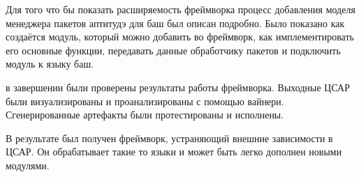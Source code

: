 Для того что бы показать расширяемость фреймворка процесс добавления моделя менеджера пакетов аптитудэ для баш был описан подробно. 
Было показано как создаётся модуль, который можно добавить во фреймворк, как имплементировать его основные функции, передавать данные обработчику пакетов и подключить модуль к языку баш.

в завершении были проверены результаты работы фреймворка.
Выходные ЦСАР были визуализированы и проанализированы с помощью вайнери.
Сгенерированные артефакты были протестированы и исполнены.

В результате был получен фреймворк, устраняющий внешние зависимости в ЦСАР.
Он обрабатывает такие то языки и может быть легко дополнен новыми модулями.

\fi